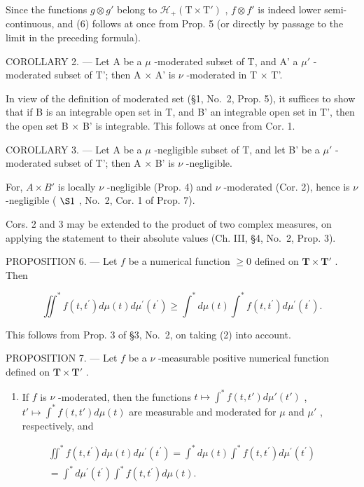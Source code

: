 Since the functions \(g \otimes g'\) belong to \(\mathcal{H}_{+}(\mathrm{T} \times \mathrm{T}')\) , \(f \otimes f'\) is indeed lower semi-continuous, and (6) follows at once from Prop. 5 (or directly by passage to the limit in the preceding formula).

COROLLARY 2. --- Let A be a \(\mu\) -moderated subset of T, and A' a \(\mu'\) -moderated subset of T'; then A × A' is \(\nu\) -moderated in T × T'.

In view of the definition of moderated set (§1, No.~2, Prop. 5), it suffices to show that if B is an integrable open set in T, and B' an integrable open set in T', then the open set B × B' is integrable. This follows at once from Cor. 1.

COROLLARY 3. --- Let A be a \(\mu\) -negligible subset of T, and let B' be a \(\mu'\) -moderated subset of T'; then A × B' is \(\nu\) -negligible.

For, \(A \times B'\) is locally \(\nu\) -negligible (Prop. 4) and \(\nu\) -moderated (Cor. 2), hence is \(\nu\) -negligible ( \(\S1\) , No.~2, Cor. 1 of Prop. 7).

Cors. 2 and 3 may be extended to the product of two complex measures, on applying the statement to their absolute values (Ch. III, §4, No.~2, Prop. 3).

PROPOSITION 6. --- Let \(f\) be a numerical function \(\geqslant 0\) defined on \(\mathbf{T} \times \mathbf{T}'\) . Then

\[
\iint^ {*} f (t, t ^ {\prime}) d \mu (t) d \mu^ {\prime} (t ^ {\prime}) \geqslant \int^ {*} d \mu (t) \int^ {*} f (t, t ^ {\prime}) d \mu^ {\prime} (t ^ {\prime}).
\]

This follows from Prop. 3 of §3, No.~2, on taking (2) into account.

PROPOSITION 7. --- Let \(f\) be a \(\nu\) -measurable positive numerical function defined on \(\mathbf{T} \times \mathbf{T}'\) .

\begin{enumerate}
\def\labelenumi{\alph{enumi})}
\tightlist
\item
  If \(f\) is \(\nu\) -moderated, then the functions \(t \mapsto \int^{*} f(t, t') d\mu'(t')\) , \(t' \mapsto \int^{*} f(t, t') d\mu(t)\) are measurable and moderated for \(\mu\) and \(\mu'\) , respectively, and
\end{enumerate}

\[
\begin{array}{r} \iint^ {*} f (t, t ^ {\prime}) d \mu (t) d \mu^ {\prime} (t ^ {\prime}) = \int^ {*} d \mu (t) \int^ {*} f (t, t ^ {\prime}) d \mu^ {\prime} (t ^ {\prime}) \\ = \int^ {*} d \mu^ {\prime} (t ^ {\prime}) \int^ {*} f (t, t ^ {\prime}) d \mu (t). \end{array}\tag{7}
\]

